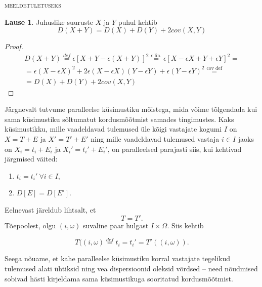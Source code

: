 \documentclass[a4paper,12pt,oneside]{article}
\newenvironment{meeldetuletus}{
	\begin{lrbox}{\thisOne}
		\begin{minipage}{0.95\textwidth} \vspace{0.25em} {\scriptsize \textsc{meeldetuletuseks}} \linebreak \vspace{-0.5em}
} 
{  
 \end{minipage}\end{lrbox}{
 		
 			\begin{mdframed}[tikzsetting={draw=black,dashed,line width=0.5pt, dash pattern = on 10pt off 3pt},%
 			linecolor=background_example,backgroundcolor=background_example,outerlinewidth=1pt]
			
 			\usebox{\thisOne}
 			\end{mdframed}
 		
 		
 	}
}
\numberwithin{equation}{section}
\theoremstyle{definition}
\newtheorem{summa_dispersioon}[equation]{Lause}
\begin{document}
\begin{meeldetuletus}
\begin{summa_dispersioon}
Juhuslike suuruste $X$ ja $Y$ puhul kehtib 
\begin{equation*}
D(X + Y) = D(X) + D(Y) + 2cov(X,Y)
\end{equation*} 
\begin{proof}
\begin{gather*}
D(X + Y) \overset{def}{=}\epsilon[X + Y - \epsilon(X + Y)]^2\overset{\text{$\epsilon$ lin.} }{=}  \epsilon [X - \epsilon X + Y + \epsilon Y]^2 = \\
 = \epsilon(X - \epsilon X)^2 + 2\epsilon (X - \epsilon X)(Y - \epsilon Y) + \epsilon (Y - \epsilon Y)^2   
 \overset{\text{cov  def}}{=}  \\   = D(X) + D(Y) + 2cov(X,Y)
\end{gather*}
\end{proof}
\end{summa_dispersioon}
\end{meeldetuletus}



Järgnevalt tutvume paralleelse küsimustiku mõistega, mida võime tõlgendada kui sama küsimustiku sõltumatut kordusmõõtmist samades tingimustes. Kaks küsimustikku, mille vaadeldavad tulemused üle kõigi vastajate kogumi $I$ on $X = T + E$ ja $X' = T' + E'$ ning mille vaadeldavad tulemused vastaja $i \in I$ jaoks on $X_i = t_i + E_i$ ja $X_i' = t_i' + E_i'$, on paralleelsed parajasti siis, kui kehtivad järgmised väited:
\begin{enumerate}
\item $t_i = t_i' ~ \forall i \in I  $,
\item $D \left[ E \right] = D \left[ E' \right] $. 
\end{enumerate}

Eelnevast järeldub lihtsalt, et  
\begin{equation}
\label{eq:true_scores_eq}
T = T' \text{.}
\end{equation} Tõepoolest, olgu $(i,\omega)$ suvaline paar hulgast $I \times \Omega$. Siis kehtib

\begin{equation*}
T((i, \omega) \overset{def}{=} t_i = t_i' = T'((i,\omega)) \text{.}
\end{equation*}

Seega nõuame, et kahe paralleelse küsimustiku korral vastajate tegelikud tulemused alati ühtiksid ning vea dispersioonid oleksid võrdsed -- need nõudmised sobivad hästi kirjeldama sama küsimustikuga sooritatud kordusmõõtmist. 
\end{document}
